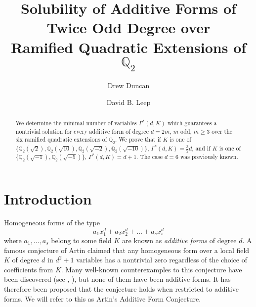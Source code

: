 \documentclass[12pt]{amsart}
\begin{document}

\baselineskip=17pt


\title[Solubility of Additive Forms of Twice Odd Degree]{Solubility of Additive Forms of \\ Twice Odd Degree over \\ Ramified Quadratic Extensions of $\mathbb{Q}_2$}

\author{Drew Duncan}
\address{Department of Mathematics\\
University of Kentucky\\
Lexington, KY 40506}

\author{David B. Leep}
\address{Department of Mathematics\\
University of Kentucky\\
Lexington, KY 40506}


\begin{abstract}
We determine the minimal number of variables $\Gamma^*(d, K)$ which guarantees a nontrivial solution for every additive form of degree $d=2m$, $m$ odd, $m \ge 3$ over the six ramified quadratic extensions of $\mathbb{Q}_2$.  We prove that if $K$ is one of $\{\mathbb{Q}_2(\sqrt{2}), \mathbb{Q}_2(\sqrt{10}), \mathbb{Q}_2(\sqrt{-2}), \mathbb{Q}_2(\sqrt{-10})\}$, $\Gamma^*(d,K) = \frac{3}{2}d$, and if $K$ is one of $\{\mathbb{Q}_2(\sqrt{-1}), \mathbb{Q}_2(\sqrt{-5})\}$,  $\Gamma^*(d,K) = d+1$.  The case $d=6$ was previously known.
\end{abstract}



\maketitle

\section{Introduction}

Homogeneous forms of the type
\begin{equation}
\label{eq}
a_1x_1^d + a_2x_2^d + \ldots + a_sx_s^d
\end{equation} where $a_1, \ldots, a_s$ belong to some field $K$ are known as \textit{additive forms} of degree $d$.  A famous conjecture of Artin claimed that any homogeneous form over a local field $K$ of degree $d$ in $d^2+1$ variables has a nontrivial zero regardless of the choice of coefficients from $K$.  Many well-known counterexamples to this conjecture have been discovered (see \cite{MR197450}, \cite{greenberg1969lectures}), but none of them have been additive forms.  It has therefore been proposed that the conjecture holds when restricted to additive forms.  We will refer to this as Artin's Additive Form Conjecture.
\end{document}

